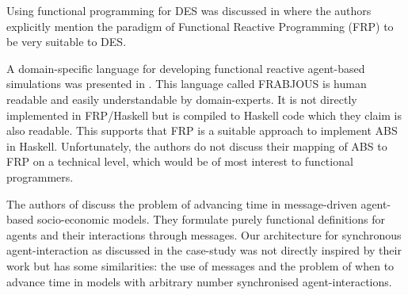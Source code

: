 Using functional programming for DES was discussed in \cite{jankovic_functional_2007} where the authors explicitly mention the paradigm of Functional Reactive Programming (FRP) to be very suitable to DES.

A domain-specific language for developing functional reactive agent-based simulations was presented in \cite{schneider_towards_2012,vendrov_frabjous_2014}. This language called FRABJOUS is human readable and easily understandable by domain-experts. It is not directly implemented in FRP/Haskell but is compiled to Haskell code which they claim is also readable. This supports that FRP is a suitable approach to implement ABS in Haskell. Unfortunately, the authors do not discuss their mapping of ABS to FRP on a technical level, which would be of most interest to functional programmers.

The authors of \cite{botta_time_2010} discuss the problem of advancing time in message-driven agent-based socio-economic models. They formulate purely functional definitions for agents and their interactions through messages. Our architecture for synchronous agent-interaction as discussed in the case-study was not directly inspired by their work but has some similarities: the use of messages and the problem of when to advance time in models with arbitrary number synchronised agent-interactions.